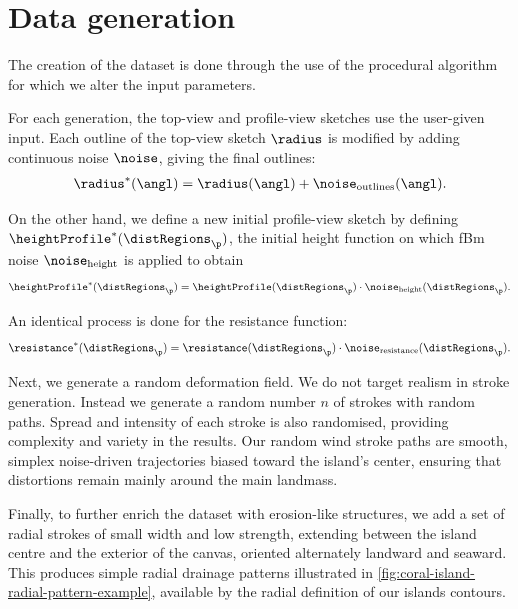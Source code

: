 \section{Data generation}
\label{sec:coral-island-dataset-generation}

The creation of the dataset is done through the use of the procedural algorithm for which we alter the input parameters.

For each generation, the top-view and profile-view sketches use the user-given input. Each outline of the top-view sketch $\radius$ is modified by adding continuous noise $\noise$, giving the final outlines:
\begin{align*}
    \radius^*(\angl) = \radius(\angl) + \noise_{\text{outlines}}(\angl).
\end{align*}

On the other hand, we define a new initial profile-view sketch by defining $\heightProfile^*(\distRegions_\p)$, the initial height function on which fBm noise $\noise_{\text{height}}$ is applied to obtain
\begin{align*}
    \heightProfile^*(\distRegions_\p) = \heightProfile(\distRegions_\p) \cdot \noise_{\text{height}}(\distRegions_\p).
\end{align*}

An identical process is done for the resistance function:
\begin{align*}
    \resistance^*(\distRegions_\p) = \resistance(\distRegions_\p) \cdot \noise_{\text{resistance}}(\distRegions_\p).
\end{align*}

Next, we generate a random deformation field. We do not target realism in stroke generation. Instead we generate a random number $n$ of strokes with random paths. Spread and intensity of each stroke is also randomised, providing complexity and variety in the results. Our random wind stroke paths are smooth, simplex noise-driven trajectories biased toward the island's center, ensuring that distortions remain mainly around the main landmass.

Finally, to further enrich the dataset with erosion-like structures, we add a set of radial strokes of small width and low strength, extending between the island centre and the exterior of the canvas, oriented alternately landward and seaward. This produces simple radial drainage patterns illustrated in \cref{fig:coral-island-radial-pattern-example}, available by the radial definition of our islands contours.

